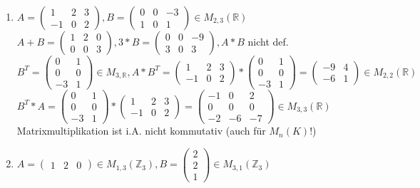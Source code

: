 \documentclass[a4paper,11pt]{article}
\begin{document}
\begin{enumerate}[label=\alph*)]
\item $A=\begin{pmatrix}1&2&3\\-1&0&2\end{pmatrix}, B=\begin{pmatrix}0&0&-3\\1&0&1\end{pmatrix}\in M_{2,3}(\mathbb{R})$ \\
$A+B=\begin{pmatrix}1&2&0\\0&0&3\end{pmatrix}, 3*B=\begin{pmatrix}0&0&-9\\3&0&3\end{pmatrix}, A*B$ nicht def. \\
$B^T=\begin{pmatrix}0&1\\0&0\\-3&1\end{pmatrix}\in M_{3,\mathbb{R}}, A*B^T=\begin{pmatrix}1&2&3\\-1&0&2\end{pmatrix}*\begin{pmatrix}0&1\\0&0\\-3&1\end{pmatrix}=\begin{pmatrix}-9&4\\-6&1\end{pmatrix}\in M_{2,2}(\mathbb{R})$ \\
$B^T*A=\begin{pmatrix}0&1\\0&0\\-3&1\end{pmatrix}*\begin{pmatrix}1&2&3\\-1&0&2\end{pmatrix}=\begin{pmatrix}-1&0&2\\0&0&0\\-2&-6&-7\end{pmatrix}\in M_{3,3}(\mathbb{R})$ \\
Matrixmultiplikation ist i.A. nicht kommutativ (auch für $M_n(K)$!)
\item $A=\begin{pmatrix}1&2&0\end{pmatrix}\in M_{1,3}(\mathbb{Z}_3), B=\begin{pmatrix}2\\2\\1\end{pmatrix}\in M_{3,1}(\mathbb{Z}_3)$ \\

\end{enumerate}
\end{document}
